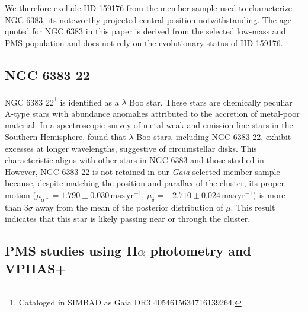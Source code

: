 \documentclass{aa}
\begin{document}
We therefore exclude HD 159176 from the member sample used to characterize NGC 6383, its noteworthy projected central position notwithstanding. The age quoted for NGC 6383 in this paper is derived from the selected low-mass and PMS population and does not rely on the evolutionary status of HD 159176.

\subsection{NGC 6383 22}
NGC 6383 22\footnote{Cataloged in SIMBAD as Gaia DR3 4054615634716139264.} is identified as a $\lambda$ Boo star. These stars are chemically peculiar A-type stars with abundance anomalies attributed to the accretion of metal-poor material. In a spectroscopic survey of metal-weak and emission-line stars in the Southern Hemisphere, \citet{2020MNRAS.499.2701M} found that $\lambda$ Boo stars, including NGC 6383 22, exhibit excesses at longer wavelengths, suggestive of circumstellar disks. This characteristic aligns with other stars in NGC 6383 and those studied in \citet{2019MNRAS.484.5102K}. However, NGC 6383 22 is not retained in our \textit{Gaia}-selected member sample because, despite matching the position and parallax of the cluster, its proper motion ($\mu_{\alpha*} = 1.790 \pm 0.030\,\mathrm{mas\,yr^{-1}}$, $\mu_{\delta} = -2.710 \pm 0.024\,\mathrm{mas\,yr^{-1}}$) is more than $3\sigma$ away from the mean of the posterior distribution of $\mu$. This result indicates that this star is likely passing near or through the cluster.

\subsection{PMS studies using \texorpdfstring{H$\alpha$}{H-alpha} photometry and VPHAS+}
\end{document}
